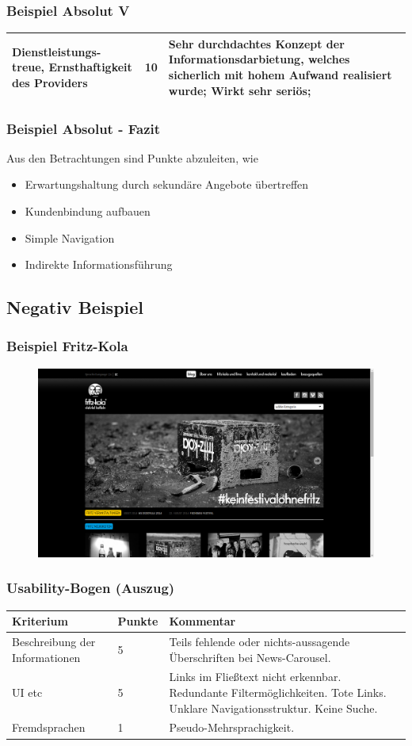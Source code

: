 \begin{frame}
	\frametitle{Beispiel Absolut V}
	\begin{tabular}{|p{}|l|p{6cm}|}
	\hline
	  Dienstleistungs- treue, Ernsthaftigkeit des Providers & 10 & Sehr durchdachtes Konzept der Informationsdarbietung, welches sicherlich mit hohem Aufwand realisiert wurde; Wirkt sehr seriös; \\ \hline
 	\end{tabular}
\end{frame}

\begin{frame}\frametitle{Beispiel Absolut - Fazit}
	Aus den Betrachtungen sind Punkte abzuleiten, wie 
	\begin{itemize}
		\item Erwartungshaltung durch sekundäre Angebote übertreffen
		\item Kundenbindung aufbauen
		\item Simple Navigation
		\item Indirekte Informationsführung
	\end{itemize}
\end{frame}

\subsection{Negativ Beispiel}
\begin{frame}
	\frametitle{Beispiel Fritz-Kola}
	\begin{figure}
	\includegraphics[scale=0.2]{bilder/fritz-kola.png}
	\end{figure}
\end{frame}

\begin{frame}
	\frametitle{Usability-Bogen (Auszug)}
	\begin{tabular}{|p{}|l|p{6cm}|}
	  \hline
	  Kriterium & Punkte & Kommentar \\ \hline
	  Beschreibung der Informationen & 5 & Teils fehlende oder nichts-aussagende Überschriften bei News-Carousel.  \\ \hline	
	  
	  UI etc & 5 & Links im Fließtext nicht erkennbar. Redundante Filtermöglichkeiten. Tote Links. Unklare Navigationsstruktur. Keine Suche.  \\ \hline		
	  Fremdsprachen & 1 & Pseudo-Mehrsprachigkeit.  \\ \hline		
	\end{tabular}
\end{frame}

